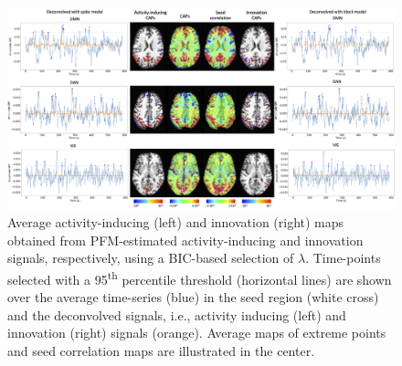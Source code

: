 \begin{figure}[t!]
    \begin{center}
        \includegraphics[width=\textwidth]{figures/caps.png}
    \end{center}
    \caption{Average activity-inducing
    (left) and
    innovation (right) maps obtained from PFM-estimated activity-inducing and
    innovation signals, respectively, using a BIC-based selection of $\lambda$.
    Time-points selected with a 95\textsuperscript{th} percentile threshold
    (horizontal lines) are shown over the average time-series (blue) in the seed
    region (white cross) and the deconvolved signals, i.e., activity inducing
    (left) and innovation (right) signals (orange). Average
    maps of extreme points and seed correlation maps are illustrated in the center.}
\label{fig:caps}
\end{figure}